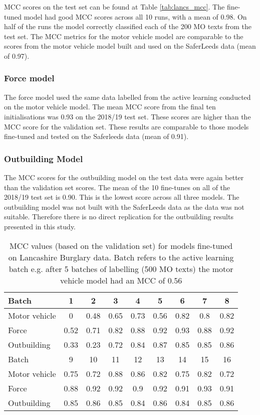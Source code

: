 MCC scores on the test set can be found at Table \ref{tab:lancs_mcc}. The fine-tuned model had good MCC scores across all 10 runs, with a mean of 0.98. On half of the runs the model correctly classified each of the 200 MO texts from the test set. The MCC metrics for the motor vehicle model are comparable to the scores from the motor vehicle model built and used on the SaferLeeds data (mean of 0.97). 

\subsubsection{Force model} The force model used the same data labelled from the active learning conducted on the motor vehicle model. The mean MCC score from the final ten initialisations was 0.93 on the 2018/19 test set. These scores are higher than the MCC score for the validation set. These results are comparable to  those models fine-tuned and tested on the Saferleeds data (mean of 0.91). 


\subsubsection{Outbuilding Model} The MCC scores for the outbuilding model on the test data were again better than the validation set scores. The mean of the 10 fine-tunes on all of the 2018/19 test set is 0.90. This is the lowest score across all three models. The outbuilding model was not built with the SaferLeeds data as the data was not suitable. Therefore there is no direct replication for the outbuilding results presented in this study.


\begin{table}[]
\centering
\begin{tabular}{@{}lcccccccc@{}}
\toprule
Batch       & 1    & 2    & 3    & 4    & 5    & 6    & 7    & 8    \\ \midrule
Motor vehicle          & 0    & 0.48 & 0.65 & 0.73 & 0.56 & 0.82 & 0.8  & 0.82 \\
Force       & 0.52 & 0.71 & 0.82 & 0.88 & 0.92 & 0.93 & 0.88 & 0.92 \\
Outbuilding & 0.33 & 0.23 & 0.72 & 0.84 & 0.87 & 0.85 & 0.85 & 0.86 \\\midrule
Batch       & 9    & 10   & 11   & 12   & 13   & 14   & 15   & 16   \\\midrule
Motor vehicle         & 0.75 & 0.72 & 0.88 & 0.86 & 0.82 & 0.75 & 0.82 & 0.72 \\
Force       & 0.88 & 0.92 & 0.92 & 0.9  & 0.92 & 0.91 & 0.93 & 0.91 \\
Outbuilding & 0.85 & 0.86 & 0.85 & 0.84 & 0.86 & 0.84 & 0.85 & 0.86 \\ \bottomrule
\end{tabular}
\caption[Batch metrics - PF2 data. All models]{\label{tab:results_1c}MCC values (based on the validation set) for models fine-tuned on Lancashire Burglary data. Batch refers to the active learning batch e.g. after 5 batches of labelling (500 MO texts) the motor vehicle model had an MCC of 0.56 }
\end{table}



